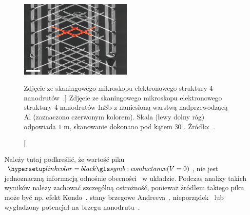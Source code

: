 \begin{figure}
    \centering
    \includegraphics[width=0.5\textwidth]{04-Includes/Figures/Observe/observe5.png}
    \caption
    [Zdjęcie ze skaningowego mikroskopu elektronowego struktury 4 nanodrutów~\cite{gazibegovic.car.2017}.]
    {
    Zdjęcie ze skaningowego mikroskopu elektronowego struktury 4 nanodrutów InSb z naniesioną warstwą nadprzewodzącą Al (zaznaczono czerwonym kolorem). 
    Skala (lewy dolny róg) odpowiada $1$ {\textmu}m, skanowanie dokonano pod kątem $30^\circ$.
    Źródło:~\cite{gazibegovic.car.2017}.
    }
    \label{fig:observe5}
\end{figure}



Należy tutaj podkreślić, że wartość piku $\conductance (V=0)$, nie jest jednoznaczną informacją odnośnie obecności \MZM\ w układzie.
Podczas analizy takich wyników należy zachować szczególną ostrożność, ponieważ źródłem takiego piku może być np. efekt Kondo~\cite{zazunov.plugge.2018},
stany brzegowe Andreeva~\cite{mourik.zuo.2012,moore.stanescu.2018,hell.flensberg.2018,liu.sau.2018,lai.sau.2019,yavilberg.ginossar.2019,danon.hellenes.2020},
nieporządek~\cite{liu.potter.2012,tuovinen.perfetto.2019}
lub wygładzony potencjał na brzegu nanodrutu~\cite{kells.meidan.2012}.

